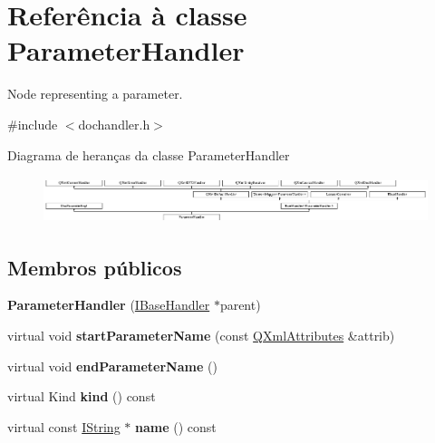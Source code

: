 \hypertarget{class_parameter_handler}{\section{Referência à classe Parameter\-Handler}
\label{class_parameter_handler}
}


Node representing a parameter.  




{\ttfamily \#include $<$dochandler.\-h$>$}

Diagrama de heranças da classe Parameter\-Handler\begin{figure}[H]
\begin{center}
\leavevmode
\includegraphics[height=1.361702cm]{class_parameter_handler}
\end{center}
\end{figure}
\subsection*{Membros públicos}
\begin{DoxyCompactItemize}
\item 
\hypertarget{class_parameter_handler_ac57a2586405b91fd28d3fa54a57e9d01}{{\bfseries Parameter\-Handler} (\hyperlink{class_i_base_handler}{I\-Base\-Handler} $\ast$parent)}\label{class_parameter_handler_ac57a2586405b91fd28d3fa54a57e9d01}

\item 
\hypertarget{class_parameter_handler_af5051ae1d2646a6b4a3b35f1687257a8}{virtual void {\bfseries start\-Parameter\-Name} (const \hyperlink{class_q_xml_attributes}{Q\-Xml\-Attributes} \&attrib)}\label{class_parameter_handler_af5051ae1d2646a6b4a3b35f1687257a8}

\item 
\hypertarget{class_parameter_handler_af596bf69b5e7ddf03a66b6d474078be9}{virtual void {\bfseries end\-Parameter\-Name} ()}\label{class_parameter_handler_af596bf69b5e7ddf03a66b6d474078be9}

\item 
\hypertarget{class_parameter_handler_af8e62c8a81ddf2283205cc8955de50eb}{virtual Kind {\bfseries kind} () const }\label{class_parameter_handler_af8e62c8a81ddf2283205cc8955de50eb}

\item 
\hypertarget{class_parameter_handler_a61b3e127d271cd613cc928e35f60125e}{virtual const \hyperlink{class_i_string}{I\-String} $\ast$ {\bfseries name} () const }\label{class_parameter_handler_a61b3e127d271cd613cc928e35f60125e}

\end{DoxyCompactItemize}
